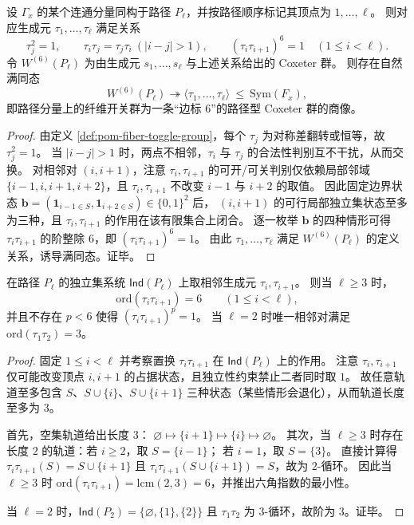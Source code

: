 \begin{theorem}\label{thm:pom-toggle-coxeter-relations-path}
设 \(\Gamma_x\) 的某个连通分量同构于路径 \(P_{\ell}\)，并按路径顺序标记其顶点为 \(1,\dots,\ell\)。
则对应生成元 \(\tau_1,\dots,\tau_{\ell}\) 满足关系
\[
\tau_j^2=1,\qquad
\tau_i\tau_j=\tau_j\tau_i\ (|i-j|>1),\qquad
(\tau_i\tau_{i+1})^{6}=1\quad(1\le i<\ell).
\]
令 \(W^{(6)}(P_\ell)\) 为由生成元 \(s_1,\dots,s_\ell\) 与上述关系给出的 Coxeter 群。
则存在自然满同态
\[
W^{(6)}(P_\ell)\twoheadrightarrow \langle \tau_1,\dots,\tau_{\ell}\rangle\ \le\ \mathrm{Sym}(F_x),
\]
即路径分量上的纤维开关群为一条“边标 \(6\)”的路径型 Coxeter 群的商像。
\end{theorem}
\begin{proof}
由定义 \ref{def:pom-fiber-toggle-group}，每个 \(\tau_j\) 为对称差翻转或恒等，故 \(\tau_j^2=1\)。
当 \(|i-j|>1\) 时，两点不相邻，\(\tau_i\) 与 \(\tau_j\) 的合法性判别互不干扰，从而交换。
对相邻对 \((i,i+1)\)，注意 \(\tau_i,\tau_{i+1}\) 的可开/可关判别仅依赖局部邻域
\(\{i-1,i,i+1,i+2\}\)，且 \(\tau_i,\tau_{i+1}\) 不改变 \(i-1\) 与 \(i+2\) 的取值。
因此固定边界状态 \(\mathbf b=(\mathbf 1_{i-1\in S},\mathbf 1_{i+2\in S})\in\{0,1\}^2\) 后，
\((i,i+1)\) 的可行局部独立集状态至多为三种，且 \(\tau_i,\tau_{i+1}\) 的作用在该有限集合上闭合。
逐一枚举 \(\mathbf b\) 的四种情形可得 \(\tau_i\tau_{i+1}\) 的阶整除 \(6\)，即 \((\tau_i\tau_{i+1})^6=1\)。
由此 \(\tau_1,\dots,\tau_\ell\) 满足 \(W^{(6)}(P_\ell)\) 的定义关系，诱导满同态。证毕。
\end{proof}

\begin{proposition}\label{prop:pom-toggle-adjacent-order-exact}
在路径 \(P_\ell\) 的独立集系统 \(\mathsf{Ind}(P_\ell)\) 上取相邻生成元 \(\tau_i,\tau_{i+1}\)。
则当 \(\ell\ge 3\) 时，
\[
\mathrm{ord}(\tau_i\tau_{i+1})=6\qquad(1\le i<\ell),
\]
并且不存在 \(p<6\) 使得 \((\tau_i\tau_{i+1})^p=1\)。
当 \(\ell=2\) 时唯一相邻对满足 \(\mathrm{ord}(\tau_1\tau_2)=3\)。
\end{proposition}
\begin{proof}
固定 \(1\le i<\ell\) 并考察置换 \(\tau_i\tau_{i+1}\) 在 \(\mathsf{Ind}(P_\ell)\) 上的作用。
注意 \(\tau_i,\tau_{i+1}\) 仅可能改变顶点 \(i,i+1\) 的占据状态，且独立性约束禁止二者同时取 \(1\)。
故任意轨道至多包含 \(S\)、\(S\cup\{i\}\)、\(S\cup\{i+1\}\) 三种状态（某些情形会退化），从而轨道长度至多为 \(3\)。

首先，空集轨道给出长度 \(3\)：
\(
\varnothing\mapsto \{i+1\}\mapsto \{i\}\mapsto \varnothing
\)。
其次，当 \(\ell\ge 3\) 时存在长度 \(2\) 的轨道：若 \(i\ge 2\)，取 \(S=\{i-1\}\)；
若 \(i=1\)，取 \(S=\{3\}\)。
直接计算得 \(\tau_i\tau_{i+1}(S)=S\cup\{i+1\}\) 且 \(\tau_i\tau_{i+1}(S\cup\{i+1\})=S\)，故为 \(2\)-循环。
因此当 \(\ell\ge 3\) 时 \(\mathrm{ord}(\tau_i\tau_{i+1})=\mathrm{lcm}(2,3)=6\)，并推出六角指数的最小性。

当 \(\ell=2\) 时，\(\mathsf{Ind}(P_2)=\{\varnothing,\{1\},\{2\}\}\) 且 \(\tau_1\tau_2\) 为 \(3\)-循环，故阶为 \(3\)。证毕。
\end{proof}


